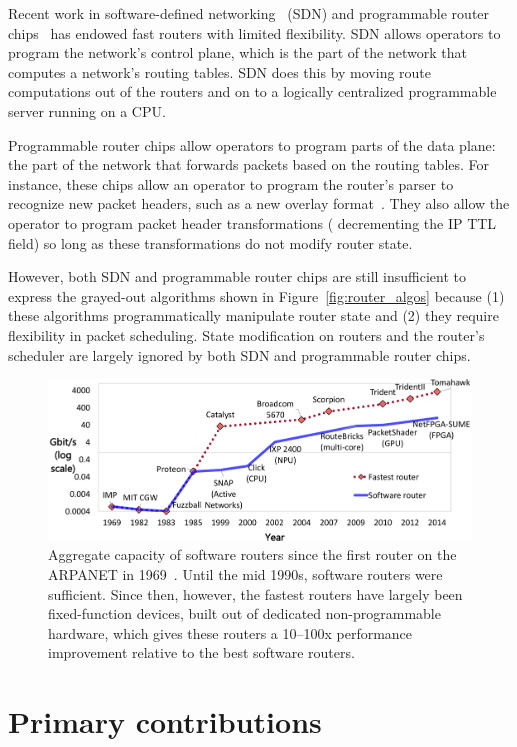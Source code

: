Recent work in software-defined networking~\cite{sdn_history} (SDN) and
programmable router chips~\cite{rmt, xpliant, flexpipe} has endowed fast
routers with limited flexibility. SDN allows operators to program the network's
control plane, which is the part of the network that computes a network's
routing tables. SDN does this by moving route computations out of the routers
and on to a logically centralized programmable server running on a CPU.

Programmable router chips allow operators to program parts of the data plane:
the part of the network that forwards packets based on the routing tables. For
instance, these chips allow an operator to program the router's parser to
recognize new packet headers, such as a new overlay format~\cite{nvgre}.
They also allow the operator to program packet header transformations (\eg
decrementing the IP TTL field) so long as these transformations do not modify
router state.

However, both SDN and programmable router chips are still insufficient to
express the grayed-out algorithms shown in Figure~\ref{fig:router_algos}
because (1) these algorithms programmatically manipulate router state and (2)
they require flexibility in packet scheduling.  State modification on routers
and the router's scheduler are largely ignored by both SDN and programmable
router chips.

\begin{figure}
\centering
\includegraphics[width=\columnwidth]{router_evolution.pdf}
\caption{Aggregate capacity of software routers since the first router on the
ARPANET in 1969~\cite{imp}. Until the mid 1990s, software routers were
sufficient. Since then, however, the fastest routers have largely been
fixed-function devices, built out of dedicated non-programmable hardware, which
gives these routers a 10--100x performance improvement relative to the best
software routers.}
\label{fig:router_evolution}
\end{figure}

\section{Primary contributions}


